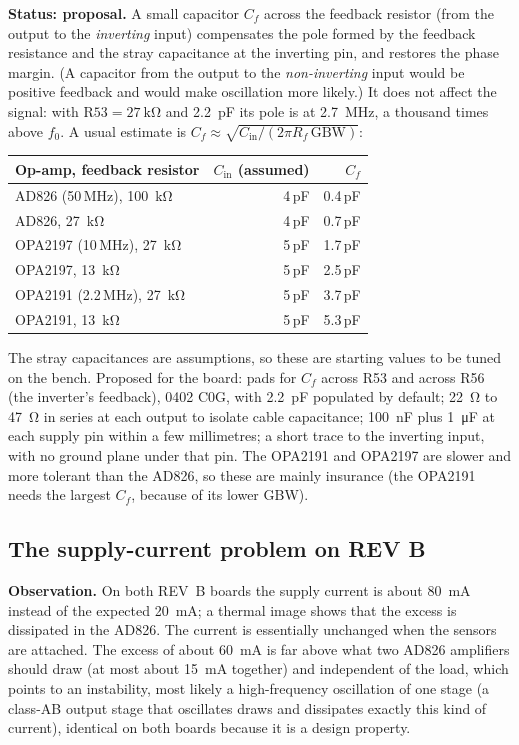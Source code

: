 \documentclass[11pt,a4paper]{article}
\begin{document}
\textbf{Status: proposal.}  A small capacitor $C_f$ across the feedback resistor (from the output to
the \emph{inverting} input) compensates the pole formed by the feedback resistance and the stray
capacitance at the inverting pin, and restores the phase margin.  (A capacitor from the output to
the \emph{non-inverting} input would be positive feedback and would make oscillation more
likely.)  It does not affect the signal: with $\mathrm{R53}=\SI{27}{\kilo\ohm}$ and
\SI{2.2}{\pico\farad} its pole is at \SI{2.7}{\mega\hertz}, a thousand times above $f_0$.  A usual
estimate is $C_f\approx\sqrt{C_{\mathrm{in}}/(2\pi R_f\,\mathrm{GBW})}$:
\begin{center}
\small
\begin{tabular}{@{}lrr@{}}
\toprule
Op-amp, feedback resistor & $C_{\mathrm{in}}$ (assumed) & $C_f$ \\
\midrule
AD826 (50\,MHz), \SI{100}{\kilo\ohm} & 4\,pF & 0.4\,pF \\
AD826, \SI{27}{\kilo\ohm}            & 4\,pF & 0.7\,pF \\
OPA2197 (10\,MHz), \SI{27}{\kilo\ohm} & 5\,pF & 1.7\,pF \\
OPA2197, \SI{13}{\kilo\ohm}          & 5\,pF & 2.5\,pF \\
OPA2191 (2.2\,MHz), \SI{27}{\kilo\ohm} & 5\,pF & 3.7\,pF \\
OPA2191, \SI{13}{\kilo\ohm}          & 5\,pF & 5.3\,pF \\
\bottomrule
\end{tabular}
\end{center}
The stray capacitances are assumptions, so these are starting values to be tuned on the bench.
Proposed for the board: pads for $C_f$ across R53 and across R56 (the inverter's feedback),
0402 C0G, with \SI{2.2}{\pico\farad} populated by default; \SI{22}{\ohm} to \SI{47}{\ohm} in
series at each output to isolate cable capacitance; \SI{100}{\nano\farad} plus
\SI{1}{\micro\farad} at each supply pin within a few millimetres; a short trace to the inverting
input, with no ground plane under that pin.  The OPA2191 and OPA2197 are slower and more tolerant
than the AD826, so these are mainly insurance (the OPA2191 needs the largest $C_f$, because of its
lower GBW).

\subsection{The supply-current problem on REV B}

\textbf{Observation.}  On both REV~B boards the supply current is about \SI{80}{\milli\ampere}
instead of the expected \SI{20}{\milli\ampere}; a thermal image shows that the excess is
dissipated in the AD826.  The current is essentially unchanged when the sensors are attached.
The excess of about \SI{60}{\milli\ampere} is far above what two AD826 amplifiers should draw
(at most about \SI{15}{\milli\ampere} together) and independent of the load, which points to
an instability, most likely a high-frequency oscillation of one stage (a class-AB output stage
that oscillates draws and dissipates exactly this kind of current), identical on both boards
because it is a design property.
\end{document}
